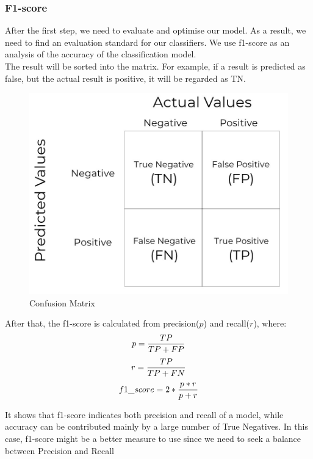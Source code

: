 \documentclass{article}
\begin{document}
\subsubsection{F1-score}
After the first step, we need to evaluate and optimise our model. As a result, we need to find an evaluation standard for our classifiers. We use f1-score as an analysis of the accuracy of the classification model. \\
The result will be sorted into the matrix. For example, if a result is predicted as false, but the actual result is positive, it will be regarded as TN. 
\begin{figure}[ht]
\centering
\includegraphics[scale=0.2]{graphs/confusion_matrix.jpeg}
\caption{Confusion Matrix\cite{6}}
\label{fig:confusion_matrix}
\end{figure}

After that, the f1-score is calculated from precision(\( p\)) and recall(\(r\)), where:
\begin{equation}
p = \frac{TP}{TP+FP}\\
\end{equation}
\begin{equation}
r = \frac{TP}{TP+FN} \\
\end{equation}
\begin{equation}
f1\_score = 2*\frac{p*r}{p+r}\\
\end{equation}

It shows that f1-score indicates both precision and recall of a model, while accuracy can be contributed mainly by a large number of True Negatives. In this case, f1-score might be a better measure to use since we need to seek a balance between Precision and Recall\cite{1}
\end{document}
